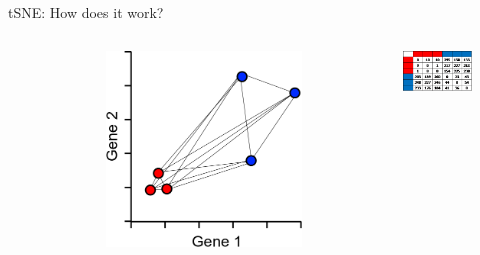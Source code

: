 \begin{frame}[allowframebreaks]{tSNE: How does it work?}
\begin{columns}
\begin{column}{0.33\textwidth}
\begin{figure}
            \end{figure}
        \end{column}
        \begin{column}{0.33\textwidth}
            \begin{figure}
                \centering
                \includegraphics[width=1\textwidth,keepaspectratio]{images/dul/dim-reduce/tsne-graph.png}
            \end{figure}
        \end{column}
        \begin{column}{0.33\textwidth}
            \begin{figure}
                \centering
                \includegraphics[width=1\textwidth,keepaspectratio]{images/dul/dim-reduce/tsne-matrix.png}
            \end{figure}
        \end{column}
    \end{columns}
\end{frame}

